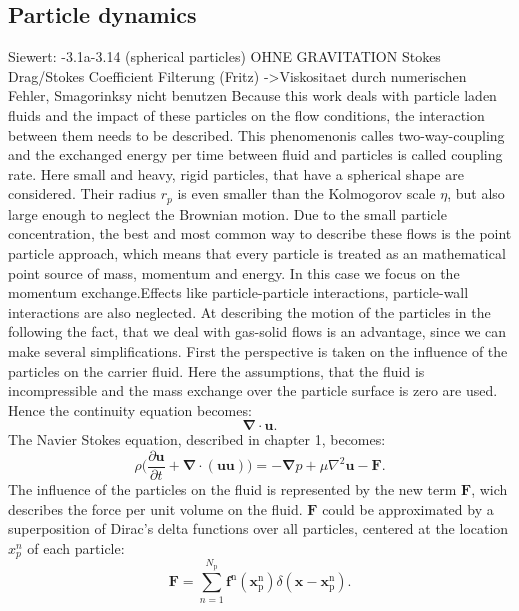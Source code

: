 \documentclass[a4paper,12pt]{article}
\renewcommand*\vec[1]{\boldsymbol{#1}}
\numberwithin{equation}{section} %
\begin{document}
\subsection{Particle dynamics} %
Siewert:
-3.1a-3.14 (spherical particles) OHNE GRAVITATION
Stokes Drag/Stokes Coefficient
Filterung (Fritz) ->Viskositaet durch numerischen Fehler, Smagorinksy nicht benutzen
\newline
\newline
Because this work deals with particle laden fluids and the impact of these particles on the flow conditions, the interaction between them needs to be described. This phenomenonis calles two-way-coupling and the exchanged energy per time between fluid and particles is called coupling rate. 
Here small and heavy, rigid particles, that have a spherical shape are considered. Their radius $ r_p $ is even smaller than the Kolmogorov scale $ \eta $, but also large enough to neglect the Brownian motion.
Due to the small particle concentration, the best and most common way to describe these flows is the point particle approach, which means that every particle is treated as an mathematical point source of mass, momentum and energy. In this case we focus on the momentum exchange.Effects like particle-particle interactions, particle-wall interactions are also neglected.  
At describing the motion of the particles in the following the fact, that we deal with gas-solid flows is an advantage, since we can make several simplifications.
First the perspective is taken on the influence of the particles on the carrier fluid. Here the assumptions, that the fluid is incompressible and the mass exchange over the particle surface is zero are used.
Hence the continuity equation becomes: 
\begin{equation}
\vec{\nabla} \cdot\vec{u}.
\end{equation}
The Navier Stokes equation, described in chapter 1, becomes:
\begin{equation}
\rho\biggl(\frac{\partial{\vec{u}}}{\partial{t}}+\vec{\nabla} \cdot (\vec{u}\vec{u})\biggl) = -\vec{\nabla}p + \mu\nabla^\mathrm{2}\vec{u}-\vec{F}.
\end{equation}
The influence of the particles on the fluid is represented by the new term $\vec{F}$, wich describes the force per unit volume on the fluid.
$\vec{F}$ could be approximated by a superposition of Dirac's delta functions over all particles, centered at the location $x_p^n$ of each particle:
\begin{equation}
\vec{F} = \sum \limits_{n=1}^{N_\mathrm{p}} \vec{f}^\mathrm{n}(\vec{x}_\mathrm{p}^\mathrm{n})\delta(\vec{x}-\vec{x}_\mathrm{p}^\mathrm{n}).
\end{equation}
\end{document}
